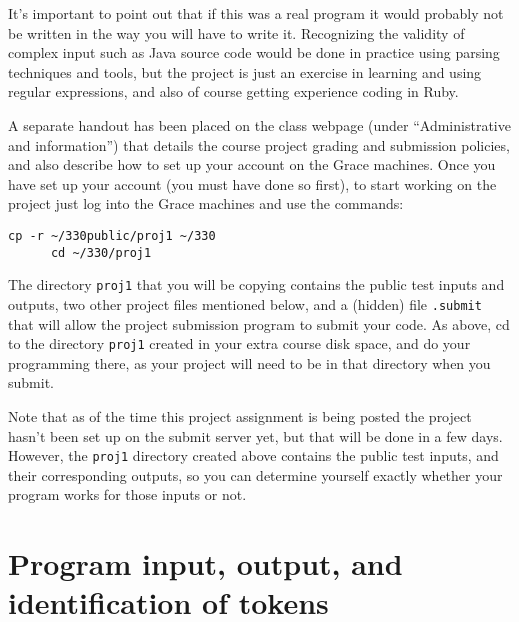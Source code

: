 \documentclass[11pt]{article}
\begin{document}
    It's important to point out that if this was a real program it would
  probably not be written in the way you will have to write it.  Recognizing
  the validity of complex input such as Java source code would be done in
  practice using parsing techniques and tools, but the project is just an
  exercise in learning and using regular expressions, and also of course
  getting experience coding in Ruby.

    A separate handout has been placed on the class webpage (under
  ``Administrative and information'') that details the course project
  grading and submission policies, and also describe how to set up your
  account on the Grace machines.  Once you have set up your account (you
  must have done so first), to start working on the project just log into
  the Grace machines and use the commands:

    \medskip

    \begin{centering}

      \begin{BVerbatim}[gobble=6]
      cp -r ~/330public/proj1 ~/330
      cd ~/330/proj1
      \end{BVerbatim}

    \end{centering}

    \medskip

    The directory \texttt{proj1} that you will be copying contains the public
  test inputs and outputs, two other project files mentioned below, and a
  (hidden) file \texttt{.submit} that will allow the project submission
  program to submit your code.  As above, cd to the directory \texttt{proj1}
  created in your extra course disk space, and do your programming there, as
  your project will need to be in that directory when you submit.

    Note that as of the time this project assignment is being posted the
  project hasn't been set up on the submit server yet, but that will be done
  in a few days.  However, the \texttt{proj1} directory created above
  contains the public test inputs, and their corresponding outputs, so you
  can determine yourself exactly whether your program works for those inputs
  or not.

  \section{Program input, output, and identification of tokens}
\end{document}

